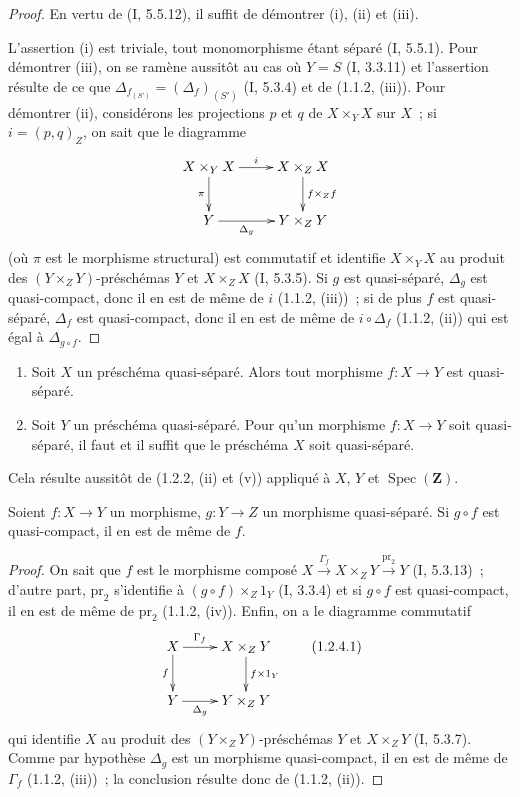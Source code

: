 \begin{proof}
En vertu de (I, 5.5.12), il suffit de démontrer (i), (ii) et (iii).

L'assertion (i) est triviale, tout monomorphisme étant séparé (I, 5.5.1).
Pour démontrer (iii), on se ramène aussitôt au cas où $Y=S$ (I, 3.3.11) et
l'assertion résulte de ce que
$\Delta_{f_{(S')}}=(\Delta_f)_{(S')}$ (I, 5.3.4) et de (1.1.2, (iii)). Pour
démontrer (ii), considérons les projections $p$ et $q$ de $X\times_Y X$ sur
$X$~; si $i=(p,q)_Z$, on sait que le diagramme
\[
\xymatrix{
  X\times_Y X \ar[r]^-{i} \ar[d]_-{\pi} & X\times_Z X
    \ar[d]^-{f\times_Z f} \\
  Y \ar[r]_-{\Delta_g} & Y\times_Z Y
}
\]
(où $\pi$ est le morphisme structural) est commutatif et identifie
$X\times_Y X$ au produit des $(Y\times_Z Y)$-préschémas $Y$ et
$X\times_Z X$ (I, 5.3.5). Si $g$ est quasi-séparé, $\Delta_g$ est
quasi-compact, donc il en est de même de $i$ (1.1.2, (iii))~; si de plus $f$
est quasi-séparé, $\Delta_f$ est quasi-compact, donc il en est de même de
$i\circ\Delta_f$ (1.1.2, (ii)) qui est égal à $\Delta_{g\circ f}$.
\end{proof}

\begin{corollary}[1.2.3]
\label{IV.1.2.3-fr}
\begin{enumerate}
  \item[(i)] Soit $X$ un préschéma quasi-séparé. Alors tout morphisme $f:X\to Y$
  est quasi-séparé.
  \item[(ii)] Soit $Y$ un préschéma quasi-séparé. Pour qu'un morphisme $f:X\to Y$
  soit quasi-séparé, il faut et il suffit que le préschéma $X$ soit
  quasi-séparé.
\end{enumerate}
\end{corollary}

Cela résulte aussitôt de (1.2.2, (ii) et (v)) appliqué à $X$, $Y$ et
$\operatorname{Spec}(\mathbf Z)$.

\begin{proposition}[1.2.4]
\label{IV.1.2.4-fr}
Soient $f:X\to Y$ un morphisme, $g:Y\to Z$ un morphisme quasi-séparé. Si
$g\circ f$ est quasi-compact, il en est de même de $f$.
\end{proposition}

\begin{proof}
On sait que $f$ est le morphisme composé
$X\xrightarrow{\Gamma_f}X\times_ZY\xrightarrow{\mathrm{pr}_2}Y$
(I, 5.3.13)~; d'autre part, $\mathrm{pr}_2$ s'identifie à
$(g\circ f)\times_Z1_Y$ (I, 3.3.4) et si $g\circ f$ est quasi-compact, il en
est de même de $\mathrm{pr}_2$ (1.1.2, (iv)). Enfin, on a le diagramme
commutatif
\[
\xymatrix{
  X \ar[r]^-{\Gamma_f} \ar[d]_-{f} & X\times_ZY
    \ar[d]^-{f\times 1_Y} \\
  Y \ar[r]_-{\Delta_g} & Y\times_ZY
}
\tag{1.2.4.1}
\label{IV.1.2.4.1-fr}
\]
qui identifie $X$ au produit des $(Y\times_ZY)$-préschémas $Y$ et
$X\times_ZY$ (I, 5.3.7). Comme par hypothèse $\Delta_g$ est un morphisme
quasi-compact, il en est de même de $\Gamma_f$ (1.1.2, (iii))~; la conclusion
résulte donc de (1.1.2, (ii)).
\end{proof}


